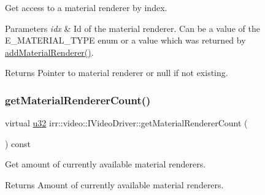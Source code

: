 Get access to a material renderer by index. 


\begin{DoxyParams}{Parameters}
{\em idx} & Id of the material renderer. Can be a value of the E\+\_\+\+M\+A\+T\+E\+R\+I\+A\+L\+\_\+\+T\+Y\+PE enum or a value which was returned by \hyperlink{classirr_1_1video_1_1IVideoDriver_a0dfc3a7168f3a73a6f4323b579f03ff6}{add\+Material\+Renderer()}. \\
\hline
\end{DoxyParams}
\begin{DoxyReturn}{Returns}
Pointer to material renderer or null if not existing. 
\end{DoxyReturn}
\mbox{\label{classirr_1_1video_1_1IVideoDriver_ac1d0e2e952afdcdbdd915dc106375381}} 
\subsubsection{\texorpdfstring{get\+Material\+Renderer\+Count()}{getMaterialRendererCount()}}
{\footnotesize\ttfamily virtual \hyperlink{namespaceirr_a0416a53257075833e7002efd0a18e804}{u32} irr\+::video\+::\+I\+Video\+Driver\+::get\+Material\+Renderer\+Count (\begin{DoxyParamCaption}{ }\end{DoxyParamCaption}) const\hspace{0.3cm}{\ttfamily [pure virtual]}}



Get amount of currently available material renderers. 

\begin{DoxyReturn}{Returns}
Amount of currently available material renderers. 
\end{DoxyReturn}
\mbox{\label{classirr_1_1video_1_1IVideoDriver_ac6f8c53abcd5a24d94c84185b0ef65e0}} 
